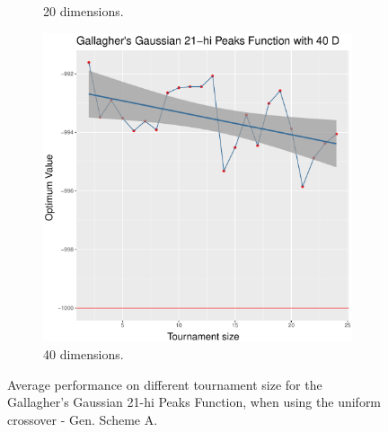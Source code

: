 \begin{figure}[t]
\begin{subfigure}[b]{0.33\textwidth}
		\caption{20 dimensions.}
	\end{subfigure}
	\begin{subfigure}[b]{0.33\textwidth}
		\centering
		\includegraphics[width=\textwidth]{img/multimodal_uniform_22_dim_40.pdf}
		\caption{40 dimensions.}
	\end{subfigure}
	\caption{Average performance on different tournament size for the Gallagher's Gaussian 21-hi Peaks Function, when using the uniform crossover - Gen. Scheme A.}
	\label{uniform-22}
\end{figure}

